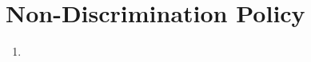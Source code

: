 \chapter{\nohyphens{Non-Discrimination Policy}}

\begin{enumerate}[label=\Alph*.]
\item 
\end{enumerate}
